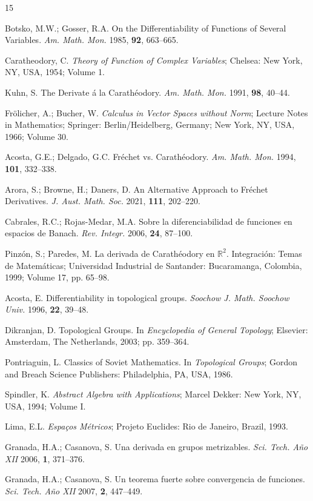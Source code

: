 \documentclass{article}
\numberwithin{theorem}{section}
\numberwithin{equation}{section}
\begin{document}
\begin{thebibliography}{15}

Botsko, M.W.; Gosser, R.A. On the Differentiability of Functions of Several Variables. \textit{Am. Math. Mon.} 1985, \textbf{92}, 663--665.

Caratheodory, C. \textit{Theory of Function of Complex Variables}; Chelsea: New York, NY, USA, 1954; Volume 1.

Kuhn, S. The Derivate á la Carathéodory. \textit{Am. Math. Mon.} 1991, \textbf{98}, 40--44.

Frölicher, A.; Bucher, W. \textit{Calculus in Vector Spaces without Norm}; Lecture Notes in Mathematics; Springer: Berlin/Heidelberg, Germany; New York, NY, USA, 1966; Volume 30.

Acosta, G.E.; Delgado, G.C. Fréchet vs. Carathéodory. \textit{Am. Math. Mon.} 1994, \textbf{101}, 332--338.

Arora, S.; Browne, H.; Daners, D. An Alternative Approach to Fréchet Derivatives. \textit{J. Aust. Math. Soc.} 2021, \textbf{111}, 202--220.

Cabrales, R.C.; Rojas-Medar, M.A. Sobre la diferenciabilidad de funciones en espacios de Banach. \textit{Rev. Integr.} 2006, \textbf{24}, 87--100.

Pinzón, S.; Paredes, M. La derivada de Carathéodory en $\mathbb{R}^2$. Integración: Temas de Matemáticas; Universidad Industrial de Santander: Bucaramanga, Colombia, 1999; Volume 17, pp. 65--98.

Acosta, E. Differentiability in topological groups. \textit{Soochow J. Math. Soochow Univ.} 1996, \textbf{22}, 39--48.

Dikranjan, D. Topological Groups. In \textit{Encyclopedia of General Topology}; Elsevier: Amsterdam, The Netherlands, 2003; pp. 359--364.

Pontriaguin, L. Classics of Soviet Mathematics. In \textit{Topological Groups}; Gordon and Breach Science Publishers: Philadelphia, PA, USA, 1986.

Spindler, K. \textit{Abstract Algebra with Applications}; Marcel Dekker: New York, NY, USA, 1994; Volume I.

Lima, E.L. \textit{Espa\c{c}os Métricos}; Projeto Euclides: Rio de Janeiro, Brazil, 1993.

Granada, H.A.; Casanova, S. Una derivada en grupos metrizables. \textit{Sci. Tech. Año XII} 2006, \textbf{1}, 371--376.

Granada, H.A.; Casanova, S. Un teorema fuerte sobre convergencia de funciones. \textit{Sci. Tech. Año XII} 2007, \textbf{2}, 447--449.

\end{thebibliography}
\end{document}
